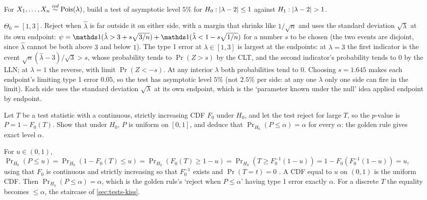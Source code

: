 \begin{exercise}
\label{ex:tests-interval-null}
For $X_1, \ldots, X_n \stackrel{iid}{\sim} \text{Pois}(\lambda)$, build a test of asymptotic level $5\%$ for $H_0: \lvert\lambda - 2\rvert \leq 1$ against $H_1: \lvert\lambda - 2\rvert > 1$.
\end{exercise}
\begin{solution}
$\Theta_0 = [1, 3]$. Reject when $\hat{\lambda}$ is far outside it on either side, with a margin that shrinks like $1/\sqrt{n}$ and uses the standard deviation $\sqrt{\lambda}$ at its own endpoint: $\psi = \ind(\hat{\lambda} > 3 + s\sqrt{3/n}) + \ind(\hat{\lambda} < 1 - s\sqrt{1/n})$ for a number $s$ to be chosen (the two events are disjoint, since $\hat{\lambda}$ cannot be both above $3$ and below $1$). The type 1 error at $\lambda \in [1, 3]$ is largest at the endpoints: at $\lambda = 3$ the first indicator is the event $\sqrt{n}(\hat{\lambda} - 3)/\sqrt{3} > s$, whose probability tends to $\Pr(Z > s)$ by the CLT, and the second indicator's probability tends to $0$ by the LLN; at $\lambda = 1$ the reverse, with limit $\Pr(Z < -s)$. At any interior $\lambda$ both probabilities tend to $0$. Choosing $s = 1.645$ makes each endpoint's limiting type 1 error $0.05$, so the test has asymptotic level $5\%$ (not $2.5\%$ per side: at any one $\lambda$ only one side can fire in the limit). Each side uses the standard deviation $\sqrt{\lambda}$ at its own endpoint, which is the `parameter known under the null' idea applied endpoint by endpoint.
\end{solution}

\begin{exercise}
\label{ex:tests-uniform}
Let $T$ be a test statistic with a continuous, strictly increasing CDF $F_0$ under $H_0$, and let the test reject for large $T$, so the $p$-value is $P = 1 - F_0(T)$. Show that under $H_0$, $P$ is uniform on $[0, 1]$, and deduce that $\Pr_{H_0}(P \leq \alpha) = \alpha$ for every $\alpha$: the golden rule gives exact level $\alpha$.
\end{exercise}
\begin{solution}
For $u \in (0, 1)$, $\Pr_{H_0}(P \leq u) = \Pr_{H_0}(1 - F_0(T) \leq u) = \Pr_{H_0}(F_0(T) \geq 1 - u) = \Pr_{H_0}(T \geq F_0^{-1}(1 - u)) = 1 - F_0(F_0^{-1}(1 - u)) = u$, using that $F_0$ is continuous and strictly increasing so that $F_0^{-1}$ exists and $\Pr(T = t) = 0$ . A CDF equal to $u$ on $(0,1)$ is the uniform CDF. Then $\Pr_{H_0}(P \leq \alpha) = \alpha$, which is the golden rule's `reject when $P \leq \alpha$' having type 1 error exactly $\alpha$. For a discrete $T$ the equality becomes $\leq \alpha$, the staircase of \cref{sec:tests-kiss}.
\end{solution}

